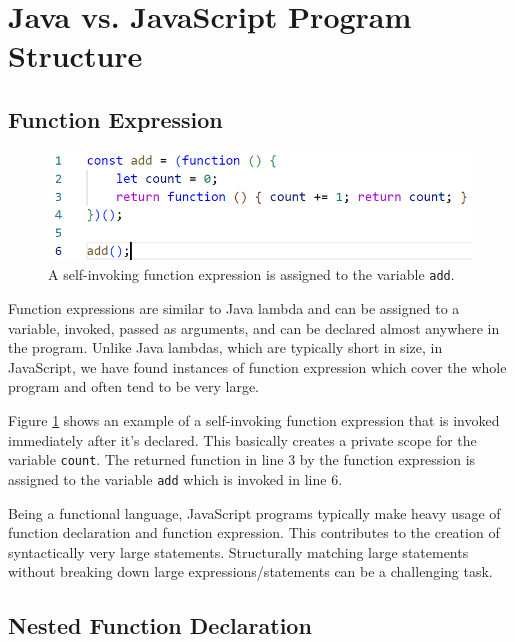 \documentclass[letterpaper,12pt,onecolumn,final]{report}
\begin{document}
\section {Java vs. JavaScript Program Structure}

\subsection {Function Expression}

\begin{figure}
\includegraphics[width=\textwidth,height=\textheight,keepaspectratio]{images/function_expression.png}
  \caption{A self-invoking function expression is assigned to the variable \texttt{add}. }
   \label{fig:functionExpression}
\end{figure} 

Function expressions are similar to Java lambda and can be assigned to a variable, invoked, passed as arguments, and can be declared almost anywhere in the program. Unlike Java lambdas, which are typically short in size, in JavaScript, we have found instances of function expression which cover the whole program and often tend to be very large. 

Figure \ref{fig:functionExpression} shows an example of a self-invoking function expression that is invoked immediately after it's declared. This basically creates a private scope for the variable \texttt{count}. The returned function in line 3 by the function expression is assigned to the variable \texttt{add} which is invoked in line 6.

Being a functional language, JavaScript programs typically make heavy usage of function declaration and function expression. This contributes to the creation of syntactically very large statements. Structurally matching large statements without breaking down large expressions/statements can be a challenging task.

\subsection {Nested Function Declaration}
\end{document}
